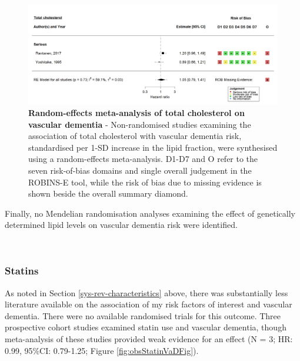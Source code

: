 \documentclass[a4paper, twoside]{templates/ociamthesis}
\begin{document}
\begin{figure}[H]
\includegraphics[width=1\linewidth]{figures/sys-rev/fp_obs_VaD_TC_} \caption[Random-effects meta-analysis of total cholesterol on vascular dementia]{\textbf{Random-effects meta-analysis of total cholesterol on vascular dementia} - Non-randomised studies examining the association of total cholesterol with vascular dementia risk, standardised per 1-SD increase in the lipid fraction, were synthesised using a random-effects meta-analysis. D1-D7 and O refer to the seven risk-of-bias domains and single overall judgement in the ROBINS-E tool, while the risk of bias due to missing evidence is shown beside the overall summary diamond.}\label{fig:lipidFractionsVaD}
\end{figure}

Finally, no Mendelian randomisation analyses examining the effect of genetically determined lipid levels on vascular dementia risk were identified.

~

\hypertarget{statins-2}{%
\subsubsection{Statins}\label{statins-2}}

As noted in Section \ref{sys-rev-characteristics} above, there was substantially less literature available on the association of my risk factors of interest and vascular dementia. There were no available randomised trials for this outcome. Three prospective cohort studies examined statin use and vascular dementia, though meta-analysis of these studies provided weak evidence for an effect (N = 3; HR: 0.99, 95\%CI: 0.79-1.25; Figure \ref{fig:obsStatinVaDFig}).
\end{document}
